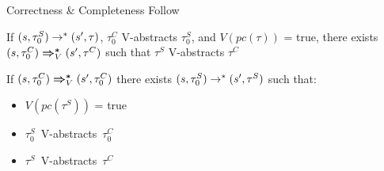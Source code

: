 \documentclass{beamer}
\newcommand{\pc}[1]{\ensuremath{pc(#1)}}
\begin{document}
\begin{frame}{Correctness \& Completeness Follow}
  \begin{corollary}[Correctness]
    If $\Sstar{(s, \tau^{S}_{0})}{(s', \tau)}$, $\tau^{C}_{0}$ V-abstracts $\tau^{S}_{0}$, and $V(\pc{\tau})$ = true, there exists $\Cstar[V]{(s, \tau^{C}_{0})}{(s', \tau^{C})}$ such that $\tau^{S}$ V-abstracts $\tau^{C}$
  \end{corollary}
  \vfill
  \begin{corollary}[Completeness]
    If $\Cstar[V]{(s, \tau_{0}^{C})}{(s', \tau_{0}^{C})}$ there exists $\Sstar{(s, \tau_{0}^{S})}{(s', \tau^{S})}$ such that:
    \begin{itemize}
      \item $V(\pc{\tau^S})$ = true
      \item $\tau_{0}^S$~V-abstracts~$\tau_{0}^C$
      \item $\tau^S$~V-abstracts~$\tau^C$
    \end{itemize}
  \end{corollary}
\end{frame}
\end{document}
